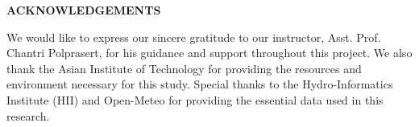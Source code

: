 {}
\begin{center}
    \large{\bf ACKNOWLEDGEMENTS}
\end{center}

We would like to express our sincere gratitude to our instructor, Asst. Prof. Chantri Polprasert, for his guidance and support throughout this project. We also thank the Asian Institute of Technology for providing the resources and environment necessary for this study. Special thanks to the Hydro-Informatics Institute (HII) and Open-Meteo for providing the essential data used in this research.
